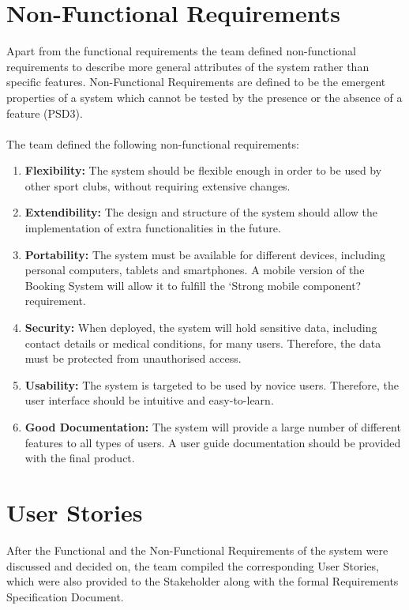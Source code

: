 \documentclass{l3proj}
\begin{document}
\section{Non-Functional Requirements}
\par
Apart from the functional requirements the team defined non-functional requirements to describe more general attributes of the system rather than specific features. Non-Functional Requirements are defined to be the emergent properties of a system which cannot be tested by the presence or the absence of a feature (PSD3). \\
\\
The team defined the following non-functional requirements:
\begin{enumerate}
	\item \textbf{Flexibility:} The system should be flexible enough in order to be used by other sport clubs, without requiring extensive changes.
	\item \textbf{Extendibility:} The design and structure of the system should allow the implementation of extra functionalities in the future.
	\item \textbf{Portability:} The system must be available for different devices, including personal computers, tablets and smartphones. A mobile version of the Booking System will allow it to fulfill the `Strong mobile component? requirement.
	\item \textbf{Security:} When deployed, the system will hold sensitive data, including contact details or medical conditions, for many users. Therefore, the data must be protected from unauthorised access.
	\item \textbf{Usability:} The system is targeted to be used by novice users. Therefore, the user interface should be intuitive and easy-to-learn.
	\item \textbf{Good Documentation:} The system will provide a large number of different features to all types of users. A user guide documentation should be provided with the final product.
\end{enumerate}

\section{User Stories}
\par
After the Functional and the Non-Functional Requirements of the system were discussed and decided on, the team compiled the corresponding User Stories, which were also provided to the Stakeholder along with the formal Requirements Specification Document.
\end{document}
